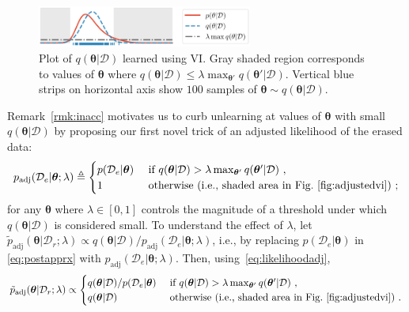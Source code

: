 \documentclass{article}
\theoremstyle{definition}
\newcommand{\mcl}[1]{\mathcal{#1}}
\newcommand{\da}{\mcl{D}}
\newcommand{\dc}{\mcl{D}_r}
\newcommand{\dr}{\mcl{D}_e}
\begin{document}
%
\begin{figure}
\centering
\includegraphics[width=0.63\textwidth]{img/vi_ep.pdf}
\caption{Plot of  $q(\bm{\theta}|\da)$ learned using VI. Gray shaded region corresponds to values of $\bm{\theta}$ where $q(\bm{\theta}|\da) \le \lambda \max_{\bm{\theta}'} q(\bm{\theta}'|\da)$. Vertical blue strips on  horizontal axis show $100$ samples of $\bm{\theta} \sim q(\bm{\theta}|\da)$.}
\label{fig:adjustedvi}
\end{figure}
%
Remark~\ref{rmk:inacc} motivates us to curb unlearning at values of $\bm{\theta}$ with small $q(\bm{\theta}|\da)$ by proposing our first novel trick of an adjusted likelihood of the erased data:
%
\begin{equation}
p_{\text{adj}}(\dr|\bm{\theta}; \lambda) \triangleq 
	\begin{cases}
		p(\dr|\bm{\theta}) &\text{ if } q(\bm{\theta}|\da) > \lambda \max_{\bm{\theta}'} q(\bm{\theta}'|\da)\ ,\\
		1 &\text{ otherwise (i.e., shaded area in Fig.~\ref{fig:adjustedvi})}\ ;
	\end{cases}
\label{eq:likelihoodadj}
\end{equation}
%
for any $\bm{\theta}$ where $\lambda \in [0,1]$ controls the magnitude of a threshold under which  $q(\bm{\theta}|\da)$ is considered small. To understand the effect of $\lambda$, let $\tilde{p}_{\text{adj}}(\bm{\theta}|\dc; \lambda) \propto q(\bm{\theta}|\da) / p_{\text{adj}}(\dr| \bm{\theta}; \lambda)$, i.e., by replacing $p(\dr| \bm{\theta})$ in \eqref{eq:postapprx} with $p_{\text{adj}}(\dr| \bm{\theta}; \lambda)$. Then, using~\eqref{eq:likelihoodadj},
%
\begin{equation}
\tilde{p}_{\text{adj}}(\bm{\theta}|\dc; \lambda) \propto 
	\begin{cases}
		q(\bm{\theta}|\da) / p(\dr| \bm{\theta}) &\text{ if } q(\bm{\theta}|\da) > \lambda \max_{\bm{\theta}'} q(\bm{\theta}'|\da)\ ,\\
		q(\bm{\theta}|\da) &\text{ otherwise (i.e., shaded area in Fig.~\ref{fig:adjustedvi})\ .}
	\end{cases}
\label{eq:postappradj}
\end{equation}
\end{document}
